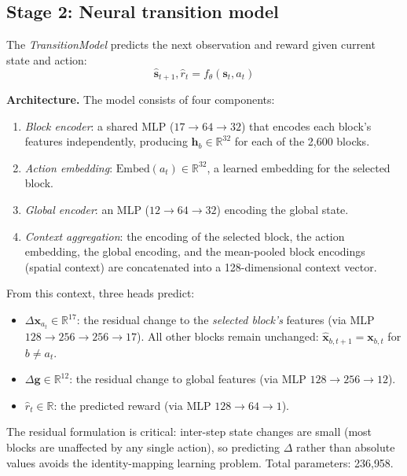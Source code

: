 \documentclass[11pt]{article}
\begin{document}
\subsection{Stage 2: Neural transition model}

The \textit{TransitionModel} predicts the next observation and reward given current state and action:
\begin{equation}
\hat{\mathbf{s}}_{t+1}, \hat{r}_t = f_\theta(\mathbf{s}_t, a_t)
\end{equation}

\textbf{Architecture.} The model consists of four components:
\begin{enumerate}
\item \textit{Block encoder}: a shared MLP ($17 \to 64 \to 32$) that encodes each block's features independently, producing $\mathbf{h}_b \in \mathbb{R}^{32}$ for each of the 2{,}600 blocks.
\item \textit{Action embedding}: $\text{Embed}(a_t) \in \mathbb{R}^{32}$, a learned embedding for the selected block.
\item \textit{Global encoder}: an MLP ($12 \to 64 \to 32$) encoding the global state.
\item \textit{Context aggregation}: the encoding of the selected block, the action embedding, the global encoding, and the mean-pooled block encodings (spatial context) are concatenated into a 128-dimensional context vector.
\end{enumerate}

From this context, three heads predict:
\begin{itemize}
\item $\Delta\mathbf{x}_{a_t} \in \mathbb{R}^{17}$: the residual change to the \textit{selected block's} features (via MLP $128 \to 256 \to 256 \to 17$). All other blocks remain unchanged: $\hat{\mathbf{x}}_{b,t+1} = \mathbf{x}_{b,t}$ for $b \neq a_t$.
\item $\Delta\mathbf{g} \in \mathbb{R}^{12}$: the residual change to global features (via MLP $128 \to 256 \to 12$).
\item $\hat{r}_t \in \mathbb{R}$: the predicted reward (via MLP $128 \to 64 \to 1$).
\end{itemize}

The residual formulation is critical: inter-step state changes are small (most blocks are unaffected by any single action), so predicting $\Delta$ rather than absolute values avoids the identity-mapping learning problem. Total parameters: 236{,}958.
\end{document}
